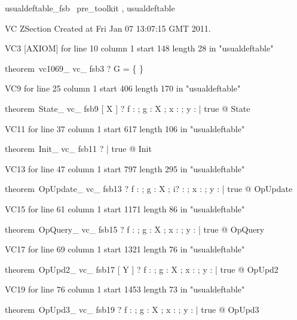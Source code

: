 \documentclass{article}
\begin{document}

\begin{zsection}
	 \SECTION usualdeftable\_fsb \parents~pre\_toolkit , usualdeftable
\end{zsection}

VC ZSection Created at Fri Jan 07 13:07:15 GMT 2011.

VC3 [AXIOM] for line 10 column 1 start 148 length 28 in "usualdeftable"
\begin{zed}
theorem~vc1069\_ vc\_ fsb3 \vdash ? \lnot G = \{ \}
\end{zed}

VC9 for line 25 column 1 start 406 length 170 in "usualdeftable"
\begin{zed}
theorem~State\_ vc\_ fsb9 [ X ] \vdash ? \forall f : \nat \fun \nat ; g : X ; x : \nat ; y : \power \nat | true @ \pre State
\end{zed}

VC11 for line 37 column 1 start 617 length 106 in "usualdeftable"
\begin{zed}
theorem~Init\_ vc\_ fsb11 \vdash ? \forall | true @ \pre Init
\end{zed}

VC13 for line 47 column 1 start 797 length 295 in "usualdeftable"
\begin{zed}
theorem~OpUpdate\_ vc\_ fsb13 \vdash ? \forall f : \nat \fun \nat ; g : X ; i? : \nat ; x : \nat ; y : \power \nat | true @ \pre OpUpdate
\end{zed}

VC15 for line 61 column 1 start 1171 length 86 in "usualdeftable"
\begin{zed}
theorem~OpQuery\_ vc\_ fsb15 \vdash ? \forall f : \nat \fun \nat ; g : X ; x : \nat ; y : \power \nat | true @ \pre OpQuery
\end{zed}

VC17 for line 69 column 1 start 1321 length 76 in "usualdeftable"
\begin{zed}
theorem~OpUpd2\_ vc\_ fsb17 [ Y ] \vdash ? \forall f : \nat \fun \nat ; g : X ; x : \nat ; y : \power \nat | true @ \pre OpUpd2
\end{zed}

VC19 for line 76 column 1 start 1453 length 73 in "usualdeftable"
\begin{zed}
theorem~OpUpd3\_ vc\_ fsb19 \vdash ? \forall f : \nat \fun \nat ; g : X ; x : \nat ; y : \power \nat | true @ \pre OpUpd3
\end{zed}
\end{document}
